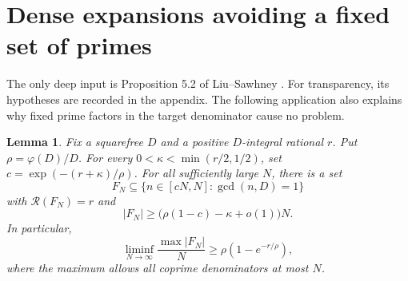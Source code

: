 \documentclass[11pt]{article}
\newtheorem{lemma}[theorem]{Lemma}
\newcommand{\R}{\mathcal R}
\begin{document}
\section{Dense expansions avoiding a fixed set of primes}
The only deep input is Proposition 5.2 of Liu--Sawhney \cite{LS}.
For transparency, its hypotheses are recorded in the appendix. The
following application also explains why fixed prime factors in the
target denominator cause no problem.

\begin{lemma}\label{dense}
Fix a squarefree $D$ and a positive $D$-integral rational $r$.
Put $\rho=\varphi(D)/D$.
For every $0<\kappa<\min(r/2,1/2)$, set $c=\exp(-(r+\kappa)/\rho)$.
For all sufficiently large $N$, there is a set
\[
 F_N\subseteq\{n\in[cN,N]:\gcd(n,D)=1\}
\]
with $\R(F_N)=r$ and
\begin{equation}\label{density}
 |F_N|\ge\bigl(\rho(1-c)-\kappa+o(1)\bigr)N.
\end{equation}
In particular,
\[
 \liminf_{N\to\infty}\frac{\max|F_N|}N
 \ge\rho(1-e^{-r/\rho}),
\]
where the maximum allows all coprime denominators at most $N$.
\end{lemma}
\end{document}
